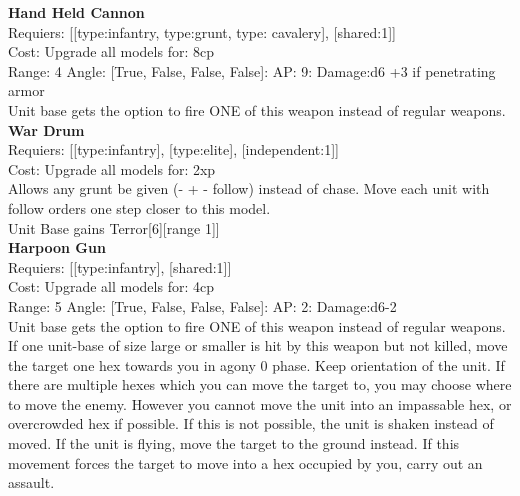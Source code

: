 {\bf Hand Held Cannon } \\

Requiers: [[type:infantry, type:grunt, type: cavalery], [shared:1]] \\
Cost: Upgrade all models for: 8cp \\


Range: 4  Angle: [True, False, False, False]: AP: 9: Damage:d6 +3 if penetrating armor \\
Unit base gets the option to fire ONE of this weapon instead of regular weapons.\\ 






{\bf War Drum } \\

Requiers: [[type:infantry], [type:elite], [independent:1]] \\
Cost: Upgrade all models for: 2xp \\
Allows any grunt be given (- + - follow) instead of chase. Move each unit with follow orders one step closer to this model.\\ 
Unit Base gains Terror[6][range 1]]\\ 







{\bf Harpoon Gun } \\

Requiers: [[type:infantry], [shared:1]] \\
Cost: Upgrade all models for: 4cp \\


Range: 5  Angle: [True, False, False, False]: AP: 2: Damage:d6-2 \\
Unit base gets the option to fire ONE of this weapon instead of regular weapons.\\ 
If one unit-base of size large or smaller is hit by this weapon but not killed, move the target one hex towards you in agony 0 phase. Keep orientation of the unit. If there are multiple hexes which you can move the target to, you may choose where to move the enemy. However you cannot move the unit into an impassable hex, or overcrowded hex if possible. If this is not possible, the unit is shaken instead of moved. If the unit is flying, move the target to the ground instead. If this movement forces the target to move into a hex occupied by you, carry out an assault.\\ 






